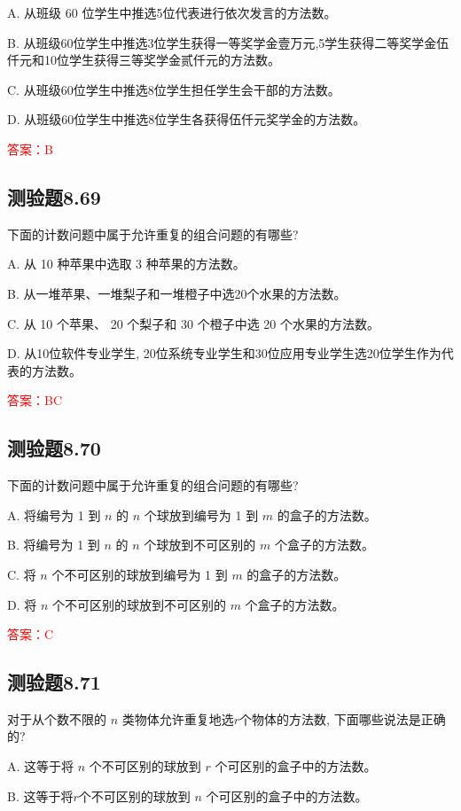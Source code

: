 \documentclass[UTF8, heading=true]{ctexart}
\begin{document}
A. 从班级 60 位学生中推选5位代表进行依次发言的方法数。

B. 从班级60位学生中推选3位学生获得一等奖学金壹万元,5学生获得二等奖学金伍仟元和10位学生获得三等奖学金贰仟元的方法数。

C. 从班级60位学生中推选8位学生担任学生会干部的方法数。

D. 从班级60位学生中推选8位学生各获得伍仟元奖学金的方法数。

\textcolor{red}{答案：B}

\subsection{测验题8.69}

下面的计数问题中属于允许重复的组合问题的有哪些?

A. 从 10 种苹果中选取 3 种苹果的方法数。

B. 从一堆苹果、一堆梨子和一堆橙子中选20个水果的方法数。

C. 从 10 个苹果、 20 个梨子和 30 个橙子中选 20 个水果的方法数。

D. 从10位软件专业学生, 20位系统专业学生和30位应用专业学生选20位学生作为代表的方法数。

\textcolor{red}{答案：BC}


\subsection{测验题8.70}

下面的计数问题中属于允许重复的组合问题的有哪些?

A. 将编号为 1 到 $n$ 的 $n$ 个球放到编号为 1 到 $m$ 的盒子的方法数。

B. 将编号为 1 到 $n$ 的 $n$ 个球放到不可区别的 $m$ 个盒子的方法数。

C. 将 $n$ 个不可区别的球放到编号为 1 到 $m$ 的盒子的方法数。

D. 将 $n$ 个不可区别的球放到不可区别的 $m$ 个盒子的方法数。

\textcolor{red}{答案：C}

\subsection{测验题8.71}

对于从个数不限的 $n$ 类物体允许重复地选$r$个物体的方法数, 下面哪些说法是正确的?

A. 这等于将 $n$ 个不可区别的球放到 $r$ 个可区别的盒子中的方法数。

B. 这等于将$r$个不可区别的球放到 $n$ 个可区别的盒子中的方法数。
\end{document}
